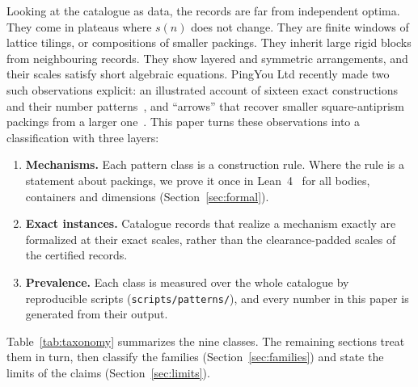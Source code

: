 \documentclass[11pt,a4paper]{article}
\newcommand{\code}[1]{\texttt{\nolinkurl{#1}}}
\theoremstyle{definition}
\theoremstyle{remark}
\begin{document}
Looking at the catalogue as data, the records are far from independent optima. They come in plateaus where $s(n)$ does not change. They are finite windows of lattice tilings, or compositions of smaller packings. They inherit large rigid blocks from neighbouring records. They show layered and symmetric arrangements, and their scales satisfy short algebraic equations. PingYou Ltd recently made two such observations explicit: an illustrated account of sixteen exact constructions and their number patterns~\cite{pingSixteen}, and ``arrows'' that recover smaller square-antiprism packings from a larger one~\cite{pingArrows}. This paper turns these observations into a classification with three layers:

\begin{enumerate}
\item \textbf{Mechanisms.} Each pattern class is a construction rule. Where the rule is a statement about packings, we prove it once in Lean~4~\cite{mathlib} for all bodies, containers and dimensions (Section~\ref{sec:formal}).
\item \textbf{Exact instances.} Catalogue records that realize a mechanism exactly are formalized at their exact scales, rather than the clearance-padded scales of the certified records.
\item \textbf{Prevalence.} Each class is measured over the whole catalogue by reproducible scripts (\code{scripts/patterns/}), and every number in this paper is generated from their output.
\end{enumerate}

Table~\ref{tab:taxonomy} summarizes the nine classes. The remaining sections treat them in turn, then classify the families (Section~\ref{sec:families}) and state the limits of the claims (Section~\ref{sec:limits}).
\end{document}
